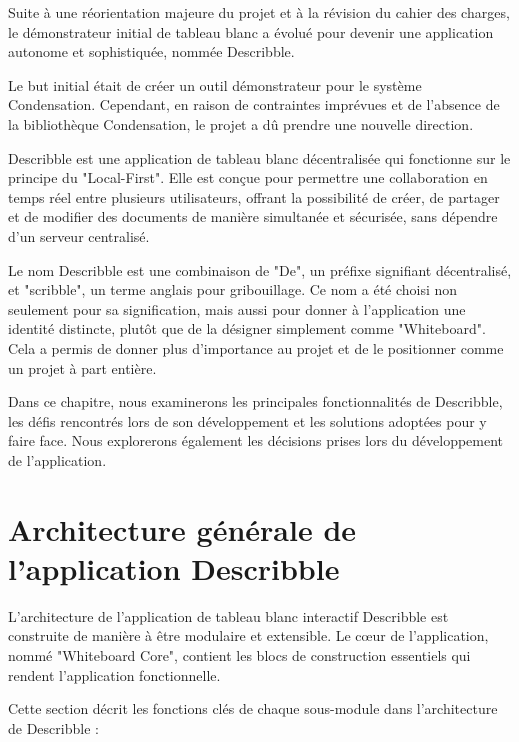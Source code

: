 Suite à une réorientation majeure du projet et à la révision du cahier des charges, le démonstrateur initial de tableau blanc a évolué pour devenir une application autonome et sophistiquée, nommée Describble.

Le but initial était de créer un outil démonstrateur pour le système Condensation. Cependant, en raison de contraintes imprévues et de l'absence de la bibliothèque Condensation, le projet a dû prendre une nouvelle direction.

Describble est une application de tableau blanc décentralisée qui fonctionne sur le principe du "Local-First". Elle est conçue pour permettre une collaboration en temps réel entre plusieurs utilisateurs, offrant la possibilité de créer, de partager et de modifier des documents de manière simultanée et sécurisée, sans dépendre d'un serveur centralisé.

Le nom Describble est une combinaison de "De", un préfixe signifiant décentralisé, et "scribble", un terme anglais pour gribouillage. Ce nom a été choisi non seulement pour sa signification, mais aussi pour donner à l'application une identité distincte, plutôt que de la désigner simplement comme "Whiteboard". Cela a permis de donner plus d'importance au projet et de le positionner comme un projet à part entière.

Dans ce chapitre, nous examinerons les principales fonctionnalités de Describble, les défis rencontrés lors de son développement et les solutions adoptées pour y faire face. Nous explorerons également les décisions prises lors du développement de l'application.

\section{Architecture générale de l'application Describble}

L'architecture de l'application de tableau blanc interactif Describble est construite de manière à être modulaire et extensible. Le cœur de l'application, nommé "Whiteboard Core", contient les blocs de construction essentiels qui rendent l'application fonctionnelle.

Cette section décrit les fonctions clés de chaque sous-module dans l'architecture de Describble :

